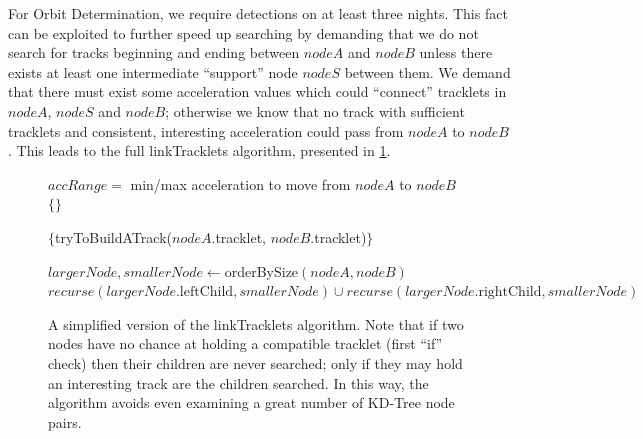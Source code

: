For Orbit Determination, we require detections on at least three
nights.  This fact can be exploited to further speed up searching by
demanding that we do not search for tracks beginning and ending
between $nodeA$ and $nodeB$ unless there exists at least one
intermediate ``support'' node $nodeS$ between them.  We demand that
there must exist some acceleration values which could ``connect''
tracklets in $nodeA$, $nodeS$ and $nodeB$; otherwise we know that no
track with sufficient tracklets and consistent, interesting
acceleration could pass from $nodeA$ to $nodeB$.  This leads to the full linkTracklets algorithm, presented in
\ref{linkTrackletsAlgorithm}.


\begin{figure}[ht!]
\begin{algorithmic}


\STATE $accRange = $ min/max acceleration to move from $nodeA$ to $nodeB$
    \RETURN $\{\}$
  \ELSE

    \STATE {}

       \RETURN $\{$tryToBuildATrack($nodeA$.tracklet, $nodeB$.tracklet)$\}$
    \ELSE

       \STATE {}

       \STATE $largerNode, smallerNode \gets $orderBySize$(nodeA, nodeB)$
       \RETURN $recurse(largerNode.\text{leftChild}, smallerNode) \cup recurse(largerNode.\text{rightChild}, smallerNode)$
  \ENDIF
\ENDIF

\end{algorithmic}
\caption{A simplified version of the linkTracklets algorithm.  Note
  that if two nodes have no chance at holding a compatible tracklet
  (first ``if'' check) then their children are never searched; only if
  they may hold an interesting track are the children searched.  In
  this way, the algorithm avoids even examining a great number of
  KD-Tree node pairs.}

 \label{linkTrackletsAlgorithm}
\end{figure}




